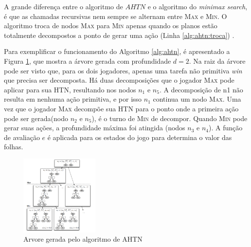 A grande diferença entre o algoritmo de $AHTN$ e o algoritmo do \textit{minimax search}, é que as chamadas recursivas nem sempre se alternam entre \textsc{Max} e \textsc{Min}. 
O algoritmo troca de nodos \textsc{Max} para \textsc{Min} apenas quando os planos estão totalmente decompostos a ponto de gerar uma ação (Linha \ref{alg:ahtn:troca}) \cite{ontanon2015adversarial}.

Para exemplificar o funcionamento do Algoritmo \ref{alg:ahtn}, é apresentado a Figura \ref{fig:ahtn}, que mostra a árvore gerada com profundidade $d = 2$. 
Na raiz da árvore pode ser visto que, para os dois jogadores, apenas uma tarefa não primitiva \textit{win} que precisa ser decomposta. 
Há duas decomposições que o jogador \textsc{Max} pode aplicar para sua HTN, resultando nos nodos $n_{1}$ e $n_{5}$. 
A decomposição de n1 não resulta em nenhuma ação primitiva, e por isso $n_{1}$ continua um nodo \textsc{Max}. 
Uma vez que o jogador \textsc{Max} decompõe sua HTN para o ponto onde a primeira ação pode ser gerada(nodo $n_{2}$ e $n_{5}$), é o turno de \textsc{Min} de decompor. Quando \textsc{Min} pode gerar suas ações, a profundidade máxima foi atingida (nodos $n_{3}$ e $n_{4}$). 
A função de avaliação $e$ é aplicada para os estados do jogo para determina o valor das folhas.

\begin{figure}[ht]
	\centering
	\includegraphics[width=0.35\textwidth]{fig/ahtn.pdf}
	\caption{Arvore gerada pelo algoritmo de AHTN}
	\label{fig:ahtn}
\end{figure} 